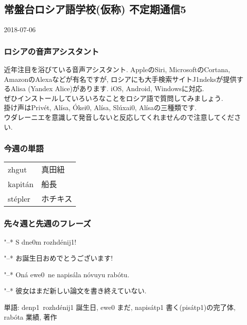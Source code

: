 \documentclass[11pt]{jsarticle}
\begin{document}
\subsection*{常盤台ロシア語学校(仮称) 不定期通信5}
\begin{flushright}
  2018-07-06
\end{flushright}
\subsubsection*{ロシアの音声アシスタント}
近年注目を浴びている音声アシスタント. AppleのSiri, MicrosoftのCortana, AmazonのAlexaなどが有名ですが,
ロシアにも大手検索サイト{J1}ndeksが提供するAlisa
(Yandex Alice)があります.
iOS, Android, Windowsに対応.\\
ぜひインストールしていろいろなことをロシア語で質問してみましょう.\\
掛け声は\flqq{}Priv\'et, Al\'isa\frqq, \flqq{}\'Oke{i0}, Al\'isa\frqq, \flqq{}Sl\'uxa{i0}, Al\'isa\frqq の三種類です.\\
ウダレーニエを意識して発音しないと反応してくれませんので注意してください.
\subsubsection*{今週の単語}
\begin{table}[ht]
  \begin{tabular}{ll}
    {zh}gut & 真田紐 \\
    kapit\'an & 船長 \\
    st\'epler & ホチキス
  \end{tabular}
\end{table}
\subsubsection*{先々週と先週のフレーズ}
\begin{multicolpar}{2}
"--* S dn{e0}m ro{zh}d\'eni{j1}!

\noindent
"--* お誕生日おめでとうございます!
\end{multicolpar}
\begin{multicolpar}{2}
"--* On\'a ew{e0}\ ne napis\'ala n\'ovu{yu} rab\'otu.

\noindent
"--* 彼女はまだ新しい論文を書き終えていない.
\end{multicolpar}
単語: den{p1}\ ro{zh}d\'eni{j1} 誕生日, ew{e0} まだ, napis\'at{p1} 書く(pis\'at{p1})の完了体, rab\'ota 業績, 著作
\end{document}
